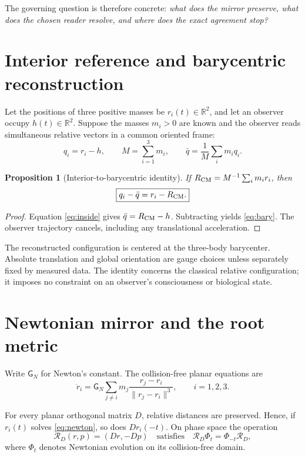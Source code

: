 \documentclass[11pt,letterpaper]{article}
\theoremstyle{paper}
\newtheorem{proposition}{Proposition}
\newcommand{\GN}{\mathsf G_{\!N}}
\newcommand{\Flow}{\Phi}
\newcommand{\Rvs}{\mathscr R}
\begin{document}
The governing question is therefore concrete: \emph{what does the mirror preserve, what does the chosen reader resolve, and where does the exact agreement stop?}

\section{Interior reference and barycentric reconstruction}

Let the positions of three positive masses be $r_i(t)\in\mathbb R^2$, and let an observer occupy $h(t)\in\mathbb R^2$. Suppose the masses $m_i>0$ are known and the observer reads simultaneous relative vectors in a common oriented frame:
\begin{equation}
q_i=r_i-h,\qquad M=\sum_{i=1}^3m_i,\qquad \bar q=\frac{1}{M}\sum_i m_iq_i.
\label{eq:inside}
\end{equation}

\begin{proposition}[Interior-to-barycentric identity]
If $R_{\rm CM}=M^{-1}\sum_i m_i r_i$, then
\begin{equation}
\boxed{q_i-\bar q=r_i-R_{\rm CM}.}
\label{eq:bary}
\end{equation}
\end{proposition}
\begin{proof}
Equation \eqref{eq:inside} gives $\bar q=R_{\rm CM}-h$. Subtracting yields \eqref{eq:bary}. The observer trajectory cancels, including any translational acceleration.
\end{proof}

The reconstructed configuration is centered at the three-body barycenter. Absolute translation and global orientation are gauge choices unless separately fixed by measured data. The identity concerns the classical relative configuration; it imposes no constraint on an observer's consciousness or biological state.

\section{Newtonian mirror and the root metric}

Write $\GN$ for Newton's constant. The collision-free planar equations are
\begin{equation}
\ddot r_i=\GN\sum_{j\ne i}m_j\frac{r_j-r_i}{\|r_j-r_i\|^3},\qquad i=1,2,3.
\label{eq:newton}
\end{equation}

For every planar orthogonal matrix $D$, relative distances are preserved. Hence, if $r_i(t)$ solves \eqref{eq:newton}, so does $D r_i(-t)$. On phase space the operation
\begin{equation}
\Rvs_D(r,p)=(Dr,-Dp)
\quad\text{satisfies}\quad
\boxed{\Rvs_D\Flow_t=\Flow_{-t}\Rvs_D,}
\label{eq:reversor}
\end{equation}
where $\Flow_t$ denotes Newtonian evolution on its collision-free domain.
\end{document}
